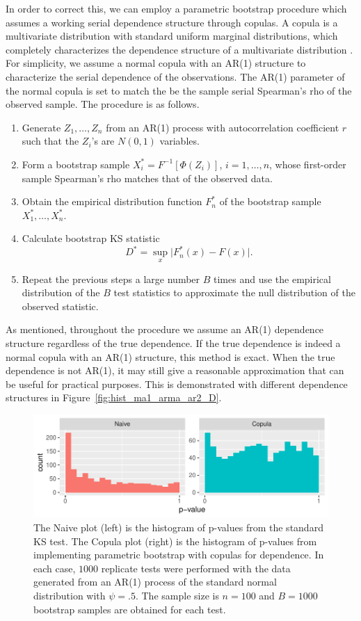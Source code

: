 \documentclass[12pt, letterpaper, titlepage]{article}
\begin{document}
In order to correct this, we can employ a parametric bootstrap procedure which
assumes a working serial dependence structure through copulas. A copula is a
multivariate distribution with standard uniform marginal distributions, which
completely characterizes the dependence structure of a multivariate
distribution \citep{Copula, Hofert}. For simplicity, we assume a normal copula 
with an AR(1) structure to characterize the serial dependence of the 
observations. The AR(1) parameter of the normal copula is set to match the be 
the sample serial Spearman's rho of the observed sample. The procedure is as 
follows.
  
\begin{enumerate}
\item
  Generate $Z_1, \ldots, Z_n$ from an AR(1) process with autocorrelation
  coefficient $r$ such that the $Z_i$'s are $N(0, 1)$ variables.
\item
  Form a bootstrap sample $X_i^* = F^{-1} [\Phi(Z_i)]$,
  $i = 1, \ldots, n$, whose first-order sample Spearman's rho matches that of
  the observed data.
\item
  Obtain the empirical distribution function $F_n^*$ of the bootstrap sample
  $X_1^*, \ldots, X_n^*$.
\item 
  Calculate bootstrap KS statistic
  \[
    D^* = \sup_x \lvert F_n^* (x)- F(x) \rvert.
  \]
\item
  Repeat the previous steps a large number $B$ times and use the empirical
    distribution of the $B$ test statistics to approximate
    the null distribution of the observed statistic.      
\end{enumerate}

As mentioned, throughout the procedure we assume an AR(1) dependence structure 
regardless of the true dependence. If the true dependence is indeed a normal 
copula with an AR(1) structure, this method is exact. When the true dependence 
is not AR(1), it may still give a reasonable approximation that can be useful 
for practical purposes. This is demonstrated with different dependence 
structures in Figure~\ref{fig:hist_ma1_arma_ar2_D}.

\begin{figure}[tbp]
  \centering
  \includegraphics{hist_ar1_D}
  \caption{The Naive plot (left) is the histogram of p-values from the 
  standard KS test. The Copula plot (right) is the histogram of p-values from 
  implementing parametric bootstrap with copulas for dependence. In each case, 
  $1000$ replicate tests were performed with the data generated from an AR(1) 
  process of the standard normal distribution with $\psi = .5$. The sample size 
  is $n = 100$ and $B = 1000$ bootstrap samples are obtained for each test.}
  \label{fig:hist_ar1_D}
\end{figure}
\end{document}
